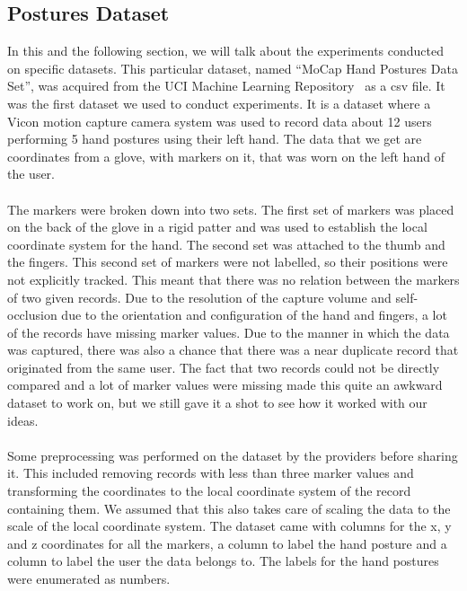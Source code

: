 \documentclass[12pt]{article}
\begin{document}
\subsection{Postures Dataset}\label{subsec:gestureset}
In this and the following section, we will talk about the experiments conducted on specific datasets. This particular dataset, named ``MoCap Hand Postures Data Set'', was acquired from the UCI Machine Learning Repository~\cite{Dua:2019} as a csv file. It was the first dataset we used to conduct experiments. It is a dataset where a Vicon motion capture camera system was used to record data about 12 users performing 5 hand postures using their left hand. The data that we get are coordinates from a glove, with markers on it, that was worn on the left hand of the user.  
\\\\
The markers were broken down into two sets. The first set of markers was placed on the back of the glove in a rigid patter and was used to establish the local coordinate system for the hand. The second set was attached to the thumb and the fingers. This second set of markers were not labelled, so their positions were not explicitly tracked. This meant that there was no relation between the markers of two given records. Due to the resolution of the capture volume and self-occlusion due to the orientation and configuration of the hand and fingers, a lot of the records have missing marker values. Due to the manner in which the data was captured, there was also a chance that there was a near duplicate record that originated from the same user. The fact that two records could not be directly compared and a lot of marker values were missing made this quite an awkward dataset to work on, but we still gave it a shot to see how it worked with our ideas.
\\\\
Some preprocessing was performed on the dataset by the providers before sharing it. This included removing records with less than three marker values and transforming the coordinates to the local coordinate system of the record containing them. We assumed that this also takes care of scaling the data to the scale of the local coordinate system. The dataset came with columns for the x, y and z coordinates for all the markers, a column to label the hand posture and a column to label the user the data belongs to. The labels for the hand postures were enumerated as numbers.
\end{document}

